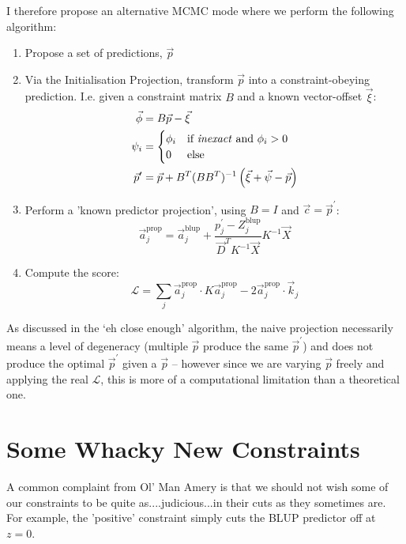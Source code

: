 \documentclass[]{article}
\begin{document}
		I therefore propose an alternative MCMC mode where we perform the following algorithm:
		\begin{enumerate}
			\item Propose a set of predictions, $\vec{p}$
			\item Via the Initialisation Projection, transform $\vec{p}$ into a constraint-obeying prediction. I.e. given a constraint matrix $B$ and a known vector-offset $\vec{\xi}$:
			\begin{align} 
				\vec{\phi} & = B \vec{p} - \vec{\xi}
				\\
				\psi_i & = \begin{cases} \phi_i &\text{if \textit{inexact} and } \phi_i > 0\\ 0 &\text{else} \end{cases}
				\\
				\vec{p}^\prime & = \vec{p} + B^T (BB^T)^{-1} \left(\vec{\xi} + \vec{\psi} - \vec{p} \right)
			\end{align}
			\item Perform a 'known predictor projection', using $B = I$ and $\vec{c} = \vec{p}^\prime$:
			\begin{equation}
				\vec{a}^\text{prop}_j = \vec{a}_j^\text{blup} + \frac{p^\prime_j - Z^\text{blup}_j}{\vec{D}^T K^{-1} \vec{X}} K^{-1} \vec{X}
			\end{equation}
			\item Compute the score:
			\begin{equation}
				\mathcal{L} = \sum_j \vec{a}^\text{prop}_j \cdot K \vec{a}^\text{prop}_j - 2 \vec{a}^\text{prop}_j \cdot \vec{k}_j
			\end{equation}
		\end{enumerate}
		As discussed in the `eh close enough' algorithm, the naive projection necessarily means a level of degeneracy (multiple $\vec{p}$ produce the same $\vec{p}^\prime$) and does not produce the optimal $\vec{p}^\prime$ given a $\vec{p}$ -- however since we are varying $\vec{p}$ freely and applying the real $\mathcal{L}$, this is more of a computational limitation than a theoretical one.

	\newpage

	\section{Some Whacky New Constraints}

		A common complaint from Ol' Man Amery is that we should not wish some of our constraints to be quite as....judicious...in their cuts as they sometimes are. For example, the 'positive' constraint simply cuts the BLUP predictor off at $z = 0$.
\end{document}
